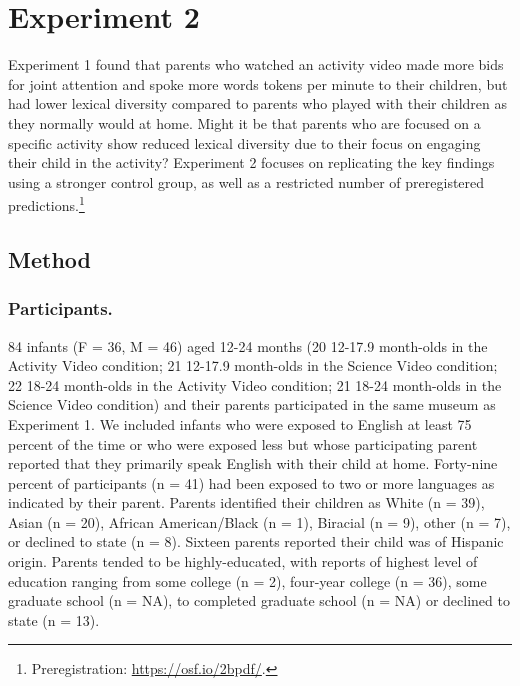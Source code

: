 \documentclass[man,floatsintext]{apa6}
\begin{document}
\hypertarget{experiment-2}{%
\section{Experiment 2}\label{experiment-2}}

Experiment 1 found that parents who watched an activity video made more bids for joint attention and spoke more words tokens per minute to their children, but had lower lexical diversity compared to parents who played with their children as they normally would at home.
Might it be that parents who are focused on a specific activity show reduced lexical diversity due to their focus on engaging their child in the activity?
Experiment 2 focuses on replicating the key findings using a stronger control group, as well as a restricted number of preregistered predictions.\footnote{Preregistration: \href{https://osf.io/2bpdf}{https://osf.io/2bpdf/}.}

\hypertarget{method-1}{%
\subsection{Method}\label{method-1}}

\hypertarget{participants.-1}{%
\subsubsection{Participants.}\label{participants.-1}}

84 infants (F = 36, M = 46) aged 12-24 months
(20 12-17.9 month-olds in the Activity Video condition;
21 12-17.9 month-olds in the Science Video condition;
22 18-24 month-olds in the Activity Video condition;
21 18-24 month-olds in the Science Video condition) and their parents participated in the same museum as Experiment 1.
We included infants who were exposed to English at least 75 percent of the time or who were exposed less but whose participating parent reported that they primarily speak English with their child at home.
Forty-nine percent of participants (n = 41) had been exposed to two or more languages as indicated by their parent.
Parents identified their children as White (n = 39), Asian (n = 20), African American/Black (n = 1), Biracial (n = 9), other (n = 7), or declined to state (n = 8).
Sixteen parents reported their child was of Hispanic origin.
Parents tended to be highly-educated, with reports of highest level of education ranging from some college (n = 2), four-year college (n = 36), some graduate school (n = NA), to completed graduate school (n = NA) or declined to state (n = 13).
\end{document}
